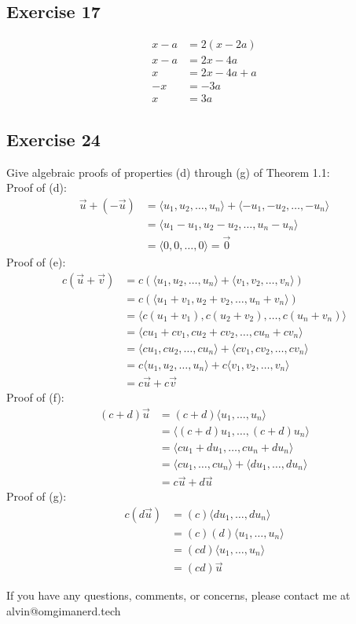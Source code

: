 \documentclass[letterpaper, 12pt]{math}
\begin{document}
\subsection*{Exercise 17}
\begin{align*}
  x-a &= 2(x-2a) \\
  x-a &= 2x-4a \\
  x &= 2x-4a+a \\
  -x &= -3a \\
  x &= 3a
\end{align*}

\subsection*{Exercise 24}
Give algebraic proofs of properties (d) through (g) of Theorem 1.1: \\
Proof of (d):
\begin{align*}
  \vec{u}+(-\vec{u}) &= \langle u_{1},u_{2},\dots,u_{n}\rangle+
    \langle-u_{1},-u_{2},\dots,-u_{n}\rangle \\
  &= \langle u_{1}-u_{1},u_{2}-u_{2},\dots,u_{n}-u_{n}\rangle \\
  &= \langle0,0,\dots,0\rangle = \vec{0}
\end{align*}
Proof of (e):
\begin{align*}
  c(\vec{u}+\vec{v}) &= c(\langle u_{1},u_{2},\dots,u_{n}\rangle+
    \langle v_{1},v_{2},\dots,v_{n}\rangle) \\
  &= c(\langle u_{1}+v_{1},u_{2}+v_{2},\dots,u_{n}+v_{n}\rangle) \\
  &= \langle c(u_{1}+v_{1}),c(u_{2}+v_{2}),\dots,c(u_{n}+v_{n})\rangle \\
  &= \langle cu_{1}+cv_{1},cu_{2}+cv_{2},\dots,cu_{n}+cv_{n}\rangle \\
  &= \langle cu_{1},cu_{2},\dots,cu_{n}\rangle+
    \langle cv_{1},cv_{2},\dots,cv_{n}\rangle \\
  &= c\langle u_{1},u_{2},\dots,u_{n}\rangle+
    c\langle v_{1},v_{2},\dots,v_{n}\rangle \\
  &= c\vec{u}+c\vec{v}
\end{align*}
Proof of (f):
\begin{align*}
  (c+d)\vec{u} &= (c+d)\langle u_{1},\dots,u_{n}\rangle \\
  &= \langle(c+d)u_{1},\dots,(c+d)u_{n}\rangle \\
  &= \langle cu_{1}+du_{1},\dots,cu_{n}+du_{n}\rangle \\
  &= \langle cu_{1},\dots,cu_{n}\rangle+\langle du_{1},\dots,du_{n}\rangle \\
  &= c\vec{u}+d\vec{u}
\end{align*}
Proof of (g):
\begin{align*}
  c(d\vec{u}) &= (c)\langle du_{1},\dots,du_{n}\rangle \\
  &= (c)(d)\langle u_{1},\dots,u_{n}\rangle \\
  &= (cd)\langle u_{1},\dots,u_{n}\rangle \\
  &= (cd)\vec{u}
\end{align*}

\begin{center}
  If you have any questions, comments, or concerns, please contact me at
  alvin@omgimanerd.tech
\end{center}
\end{document}
